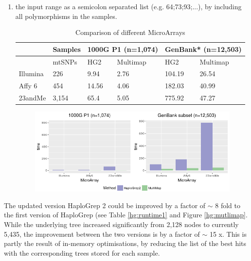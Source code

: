 \begin{enumerate}[label=(\alph*)]
\item  the input range as a semicolon separated list (e.g. 64;73;93;...), by including all polymorphisms in the samples. 

\begin{table}[H]
\centering
\caption{Comparison of different MicroArrays}
\label{hg:}
\begin{tabular}{ll|l|l|l|l|}
\cline{3-6}
                               & Samples & \multicolumn{2}{l|}{1000G P1 (n=1,074)} & \multicolumn{2}{l|}{GenBank* (n=12,503)} \\ \hline
\multicolumn{1}{|l|}{}         & mtSNPs  & HG2               & Multimap            & HG2              & Multimap           \\ \hline
\multicolumn{1}{|l|}{Illumina} & 226     & 9.94              & 2.76                & 104.19           & 26.54              \\ \hline
\multicolumn{1}{|l|}{Affy 6}   & 454     & 14.56             & 4.06                & 182.03           & 40.99              \\ \hline
\multicolumn{1}{|l|}{23andMe}  & 3,154   & 65.4              & 5.05                & 775.92           &       47.27             \\ \hline
\end{tabular}
\end{table}
\begin{figure}[!ht]
    \centering
    \includegraphics[width=1\textwidth]{images/multimap2.png}
    \caption[Run time comparison of HaploGrep versions]{} 
    \label{hg:multimap2}
\end{figure}
\end{enumerate}

The updated version HaploGrep 2 could be improved by a factor of $\sim$ 8 fold to the first version of HaploGrep (see Table \ref{hg:runtime1} and Figure \ref{hg:mutlimap}. While the underlying tree increased significantly from 2,128 nodes to currently 5,435, the improvement between the two versions is by a factor of $\sim$ 15 x. This is partly the result of in-memory optimisations, by reducing the list of the best hits with the corresponding trees stored for each sample. 

